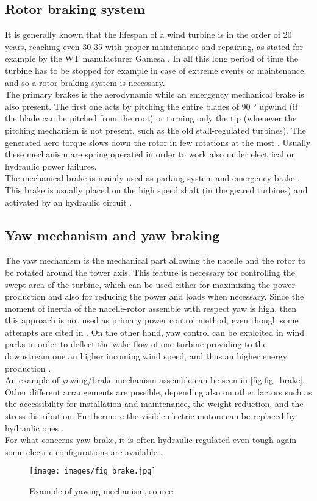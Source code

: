 \subsection{Rotor braking system}
It is generally known that the lifespan of a wind turbine is in the order of 20 years, reaching even 30-35 with proper maintenance and repairing, as stated for example by the WT manufacturer Gamesa \cite{gamesa_life_turbine}. In all this long period of time the turbine has to be stopped for example in case of extreme events or maintenance, and so a rotor braking system is necessary.\\
The primary brakes is the aerodynamic while an emergency mechanical brake is also present. The first one acts by pitching the entire blades of 90 $\si{\degree}$ upwind (if the blade can be pitched from the root) or turning only the tip (whenever the pitching mechanism is not present, such as the old stall-regulated turbines). The generated aero torque slows down the rotor in few rotations at the most \cite{brake_dromstorre}. Usually these mechanism are spring operated in order to work also under electrical or hydraulic power failures.\\
The mechanical brake is mainly used as parking system and emergency brake \cite{brake_dromstorre}. This brake is usually placed on the high speed shaft (in the geared turbines) and activated by an hydraulic circuit \cite{brake_wiley}. 

\subsection{Yaw mechanism and yaw braking}
The yaw mechanism is the mechanical part allowing the nacelle and the rotor to be rotated around the tower axis. This feature is necessary for controlling the swept area of the turbine, which can be used either for maximizing the power production and also for reducing the power and loads when necessary. Since the moment of inertia of the nacelle-rotor assemble with respect yaw is high, then this approach is not used as primary power control method, even though some attempts are cited in \cite{Kim_2014}. On the other hand, yaw control can be exploited in wind parks in order to deflect the wake flow of one turbine providing to the downstream one an higher incoming wind speed, and thus an higher energy production \cite{Kim_2014}.\\
An example of yawing/brake mechanism assemble can be seen in \autoref{fig:fig_brake}. Other different arrangements are possible, depending also on other factors such as the accessibility for installation and maintenance, the weight reduction, and the stress distribution. Furthermore the visible electric motors can be replaced by hydraulic ones \cite{Kim_2014}.\\
For what concerns yaw brake, it is often hydraulic regulated even tough again some electric configurations are available \cite{Kim_2014}. 
\begin{figure}
  \centering
  \texttt{[image: images/fig\_brake.jpg]}
  \caption{Example of yawing mechanism, source \cite{Kim_2014}}
  \label{fig:fig_brake}
\end{figure}
